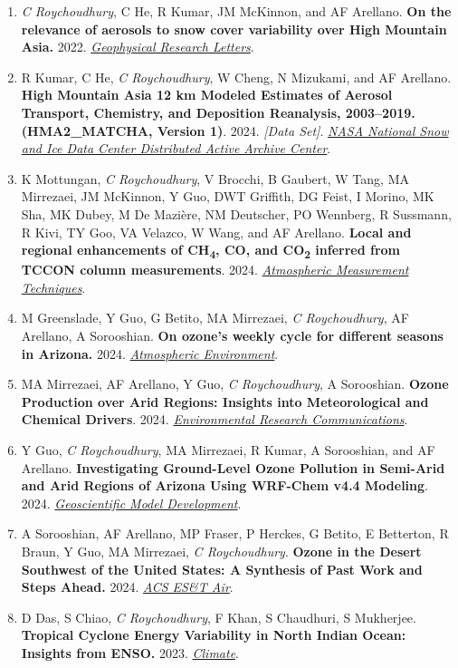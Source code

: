\documentclass[11pt]{article}
\begin{document}
\begin{enumerate}[topsep=2pt, partopsep=1pt, itemsep=4pt, parsep=1pt, leftmargin=18pt, label=\arabic*.]
		\item \textit{C Roychoudhury}, C He, R Kumar, JM McKinnon, and AF Arellano. \textbf{On the relevance of aerosols to snow cover variability over High Mountain Asia.} 2022. \href{https://doi.org/10.1029/2022GL099317}{\textit{Geophysical Research Letters}}.
		
		\item R Kumar, C He, \textit{C Roychoudhury}, W Cheng, N Mizukami, and AF Arellano. \textbf{High Mountain Asia 12 km Modeled Estimates of Aerosol Transport, Chemistry, and Deposition Reanalysis, 2003--2019. (HMA2\_MATCHA, Version 1)}. 2024. \textit{[Data Set]}. \href{https://doi.org/10.5067/CG4OT8DJX2Z7}{\textit{NASA National Snow and Ice Data Center Distributed Active Archive Center}}.
		
		\item K Mottungan, \textit{C Roychoudhury}, V Brocchi, B Gaubert, W Tang, MA Mirrezaei, JM McKinnon, Y Guo, DWT Griffith, DG Feist, I Morino, MK Sha, MK Dubey, M De Mazi\`{e}re, NM Deutscher, PO Wennberg, R Sussmann, R Kivi, TY Goo, VA Velazco, W Wang, and AF Arellano. \textbf{Local and regional enhancements of CH\textsubscript{4}, CO, and CO\textsubscript{2} inferred from TCCON column measurements}. 2024. \href{https://doi.org/10.5194/amt-17-5861-2024}{\textit{Atmospheric Measurement Techniques}}.
		
		\item M Greenslade, Y Guo, G Betito, MA Mirrezaei, \textit{C Roychoudhury}, AF Arellano, A Sorooshian. \textbf{On ozone's weekly cycle for different seasons in Arizona.} 2024. \href{https://doi.org/10.1016/j.atmosenv.2024.120703}{\textit{Atmospheric Environment}}.
		
		\item MA Mirrezaei, AF Arellano, Y Guo, \textit{C Roychoudhury}, A Sorooshian. \textbf{Ozone Production over Arid Regions: Insights into Meteorological and Chemical Drivers}. 2024. \href{https://iopscience.iop.org/article/10.1088/2515-7620/ad484c}{\textit{Environmental Research Communications}}.
		
		\item Y Guo, \textit{C Roychoudhury}, MA Mirrezaei, R Kumar, A Sorooshian, and AF Arellano. \textbf{Investigating Ground-Level Ozone Pollution in Semi-Arid and Arid Regions of Arizona Using WRF-Chem v4.4 Modeling}. 2024. \href{https://doi.org/10.5194/gmd-17-4331-2024}{\textit{Geoscientific Model Development}}.
		
		\item A Sorooshian, AF Arellano, MP Fraser, P Herckes, G Betito, E Betterton, R Braun, Y Guo, MA Mirrezaei, \textit{C Roychoudhury}. \textbf{Ozone in the Desert Southwest of the United States: A Synthesis of Past Work and Steps Ahead.} 2024. \href{https://doi.org/10.1021/acsestair.3c00033}{\textit{ACS ES\&T Air}}.
		
		\item D Das, S Chiao, \textit{C Roychoudhury}, F Khan, S Chaudhuri, S Mukherjee. \textbf{Tropical Cyclone Energy Variability in North Indian Ocean: Insights from ENSO.} 2023. \href{https://www.mdpi.com/2225-1154/11/12/232}{\textit{Climate}}.
		
	\end{enumerate}
	
\end{document}
